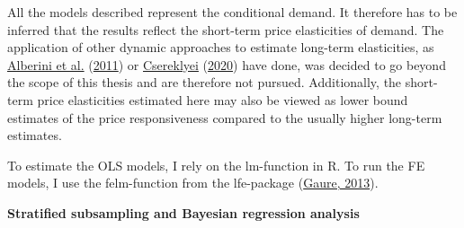 \documentclass[12pt,twoside]{reedthesis}
\begin{document}
All the models described represent the conditional demand. It therefore has to be inferred that the results reflect the short-term price elasticities of demand. The application of other dynamic approaches to estimate long-term elasticities, as \protect\hyperlink{ref-alberini_etal11}{Alberini et al.} (\protect\hyperlink{ref-alberini_etal11}{2011}) or \protect\hyperlink{ref-csereklyei20}{Csereklyei} (\protect\hyperlink{ref-csereklyei20}{2020}) have done, was decided to go beyond the scope of this thesis and are therefore not pursued. Additionally, the short-term price elasticities estimated here may also be viewed as lower bound estimates of the price responsiveness compared to the usually higher long-term estimates.

To estimate the OLS models, I rely on the lm-function in R. To run the FE models, I use the felm-function from the lfe-package (\protect\hyperlink{ref-gaure2013lfe}{Gaure, 2013}).

\textbf{Stratified subsampling and Bayesian regression analysis}
\end{document}
